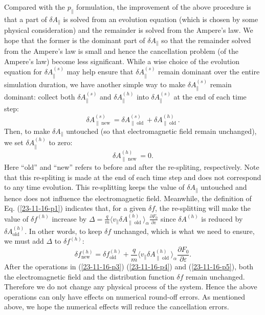 \documentclass{article}
\newcommand{\nobracket}{}
\newcommand{\tmop}[1]{\ensuremath{\operatorname{#1}}}
\begin{document}
Compared with the $p_{\parallel}$ formulation, the improvement of the above
procedure is that a part of $\delta A_{\parallel}$ is solved from an evolution
equation (which is chosen by some physical consideration) and the remainder is
solved from the Ampere's law. We hope that the former is the dominant part of
$\delta A_{\parallel}$ so that the remainder solved from the Ampere's law is
small and hence the cancellation problem (of the Ampere's law) become less
significant. While a wise choice of the evolution equation for $\delta
A_{\parallel}^{(s)}$ may help ensure that $\delta A_{\parallel}^{(s)}$ remain
dominant over the entire simulation duration, we have another simple way to
make $\delta A_{\parallel}^{(s)}$ remain dominant: collect both $\delta
A_{\parallel}^{(s)}$ and $\delta A_{\parallel}^{(h)}$ into $\delta
A_{\parallel}^{(s)}$ at the end of each time step:
\begin{equation}
  \label{23-11-16-p3} \delta A_{\| \nobracket \tmop{new}}^{(s)} = \delta A_{\|
  \nobracket \tmop{old}}^{(s)} + \delta A_{\| \nobracket \tmop{old}}^{(h)} .
\end{equation}
Then, to make $\delta A_{\parallel}$ untouched (so that electromagnetic field
remain unchanged), we set $\delta A_{\parallel}^{(h)}$ to zero:
\begin{equation}
  \label{23-11-16-p4} \delta A_{\| \nobracket \tmop{new}}^{(h)} = 0.
\end{equation}
Here ``old'' and ``new'' refers to before and after the re-spliting,
respectively. Note that this re-spliting is made at the end of each time step
and does not correspond to any time evolution. This re-splitting keeps the
value of $\delta A_{\| \nobracket}$ untouched and hence does not influence the
electromagnetic field. Meanwhile, the definition of Eq. (\ref{23-11-16-p1})
indicates that, for a given $\delta f$, the re-splitting will make the value
of $\delta f^{(h)}$ increase by $\Delta = \frac{q}{m} \langle v_{\parallel}
\delta A_{\parallel \tmop{old}}^{(h)} \rangle_{\alpha} \frac{\partial
F_0}{\partial \varepsilon}$ since $\delta A^{(h)}$ is reduced by $\delta
A^{(h)}_{\tmop{old}}$. In other words, to keep $\delta f$ unchanged, which is
what we need to ensure, we must add $\Delta$ to $\delta f^{(h)}$:
\begin{equation}
  \label{23-11-16-p5} \delta f^{(h)}_{\tmop{new}} = \delta
  f^{(h)}_{\tmop{old}} + \frac{q}{m} \langle v_{\parallel} \delta A_{\parallel
  \tmop{old}}^{(h)} \rangle_{\alpha} \frac{\partial F_0}{\partial \varepsilon}
  .
\end{equation}
After the operations in (\ref{23-11-16-p3}) (\ref{23-11-16-p4}) and
(\ref{23-11-16-p5}), both the electromagnetic field and the distribution
function $\delta f$ remain unchanged. Therefore we do not change any physical
process of the system. Hence the above operations can only have effects on
numerical round-off errors. As mentioned above, we hope the numerical effects
will reduce the cancellation errors.
\end{document}
